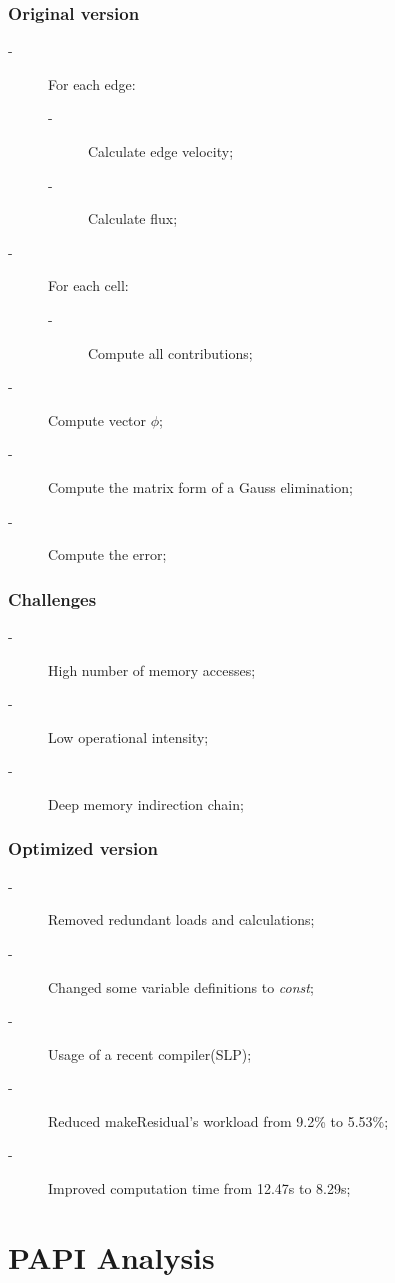 \documentclass{beamer}
\begin{document}
\begin{frame}
	\frametitle{Original version}
	\begin{description}
	\item [-] For each edge:
	\begin{description}
		\item [-] Calculate edge velocity;
		\item [-] Calculate flux;
	\end{description}
	\item [-] For each cell:
	\begin{description}
		\item [-] Compute all contributions;
	\end{description}
	\item [-] Compute vector $\phi$;
	\item [-] Compute the matrix form of a Gauss elimination;
	\item [-] Compute the error;
	\end{description}
\end{frame}

\begin{frame}
	\frametitle{Challenges}
	\begin{description}
	\item [-] High number of memory accesses;
	\item [-] Low operational intensity;
	\item [-] Deep memory indirection chain;
	\end{description}
\end{frame}

\begin{frame}
	\frametitle{Optimized version}
	\begin{description}
		\item [-] Removed redundant loads and calculations;
		\item [-] Changed some variable definitions to \emph{const};
		\item [-] Usage of a recent compiler(SLP);
		\item [-] Reduced makeResidual's workload from 9.2\% to 5.53\%;
		\item [-] Improved computation time from 12.47s to 8.29s;
	\end{description} 
\end{frame}

\section{PAPI Analysis}
\end{document}
